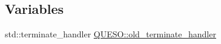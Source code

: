 \subsection*{Variables}
\begin{DoxyCompactItemize}
\item 
std\-::terminate\-\_\-handler \hyperlink{namespace_q_u_e_s_o_ac54b755ffb94b8896563c43fec9a6a4c}{Q\-U\-E\-S\-O\-::old\-\_\-terminate\-\_\-handler}
\end{DoxyCompactItemize}
